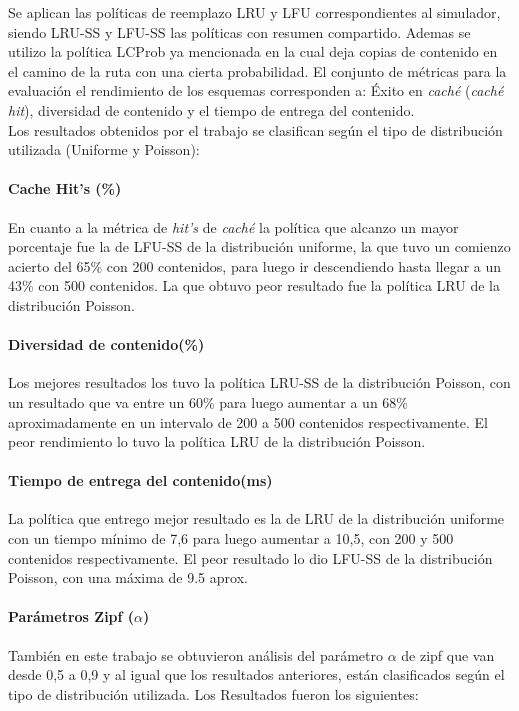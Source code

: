 \documentclass[12pt]{ociamthesis}  %
\begin{document}
Se aplican las políticas de reemplazo LRU y LFU correspondientes al simulador, siendo LRU-SS y LFU-SS las políticas con resumen compartido. Ademas se utilizo la política LCProb ya mencionada en \cite{ZHANG20133128} la cual deja copias de contenido en el camino de la ruta con una cierta probabilidad. El conjunto de métricas para la evaluación el rendimiento de los esquemas corresponden a: Éxito en \textit{caché} (\textit{caché hit}), diversidad de contenido y el tiempo de entrega del contenido.\\

Los resultados obtenidos por el trabajo se clasifican según el tipo de distribución utilizada (Uniforme y Poisson):

\paragraph{Cache Hit's (\%)}
En cuanto a la métrica de \textit{hit's} de \textit{caché} la política que alcanzo un mayor porcentaje fue la de LFU-SS de la distribución uniforme, la que tuvo un comienzo acierto del 65\% con 200 contenidos, para luego ir descendiendo hasta llegar a un 43\% con 500 contenidos. La que obtuvo peor resultado fue la política LRU de la distribución Poisson.

\paragraph{Diversidad de contenido(\%)}
Los mejores resultados los tuvo la política LRU-SS de la distribución Poisson, con un resultado que va entre un 60\% para luego aumentar a un 68\% aproximadamente en un intervalo de 200 a 500 contenidos respectivamente. El peor rendimiento lo tuvo la política LRU de la distribución Poisson.\\

\paragraph{Tiempo de entrega del contenido(ms)}
La política que entrego mejor resultado es la de LRU de la distribución uniforme con un tiempo mínimo de 7,6 para luego aumentar a 10,5, con 200 y 500 contenidos respectivamente. El peor resultado lo dio LFU-SS de la distribución Poisson, con una máxima de 9.5 aprox.\\

\paragraph{Parámetros Zipf ($\alpha$)}
También en este trabajo se obtuvieron análisis del parámetro $\alpha$ de zipf que van desde 0,5 a 0,9 y al igual que los resultados anteriores, están clasificados según el tipo de distribución utilizada. Los Resultados fueron los siguientes:
\end{document}
